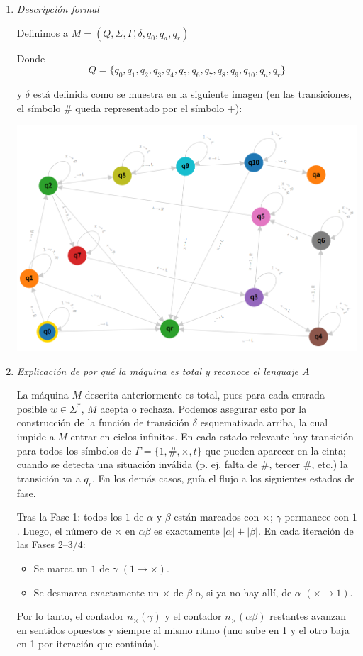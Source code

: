 \documentclass{article}
\begin{document}
\begin{enumerate}
\begin{enumerate}
    \item \textit{Descripción formal}

Definimos a $M = (Q, \Sigma, \Gamma, \delta, q_0, q_{a}, q_{r})$

Donde $$ Q = \{ q_0, q_1, q_2, q_3, q_4, q_5, q_6, q_7, q_8, q_9, q_{10}, q_{a}, q_{r} \}$$

y $\delta$ está definida como se muestra en la siguiente imagen (en las transiciones, el símbolo $\#$ queda representado por el símbolo +):

\includegraphics[scale = 0.42]{unary adder.png}

    \item \textit{Explicación de por qué la máquina es total y reconoce el lenguaje $A$}

La máquina $M$ descrita anteriormente es total, pues para cada entrada posible $w \in \Sigma^*$, $M$ acepta o rechaza. Podemos asegurar esto por la construcción de la función de transición $\delta$ esquematizada arriba, la cual impide a $M$ entrar en ciclos infinitos. En cada estado relevante hay transición para todos los símbolos de $\Gamma=\{1,\#,\times,t\}$ que pueden aparecer en la cinta; cuando se detecta una situación inválida (p. ej. falta de $\#$, tercer $\#$, etc.) la transición va a $q_r$. En los demás casos, guía el flujo a los siguientes estados de fase.

Tras la Fase 1: todos los $1$ de $\alpha$ y $\beta$ están marcados con $\times$; $\gamma$ permanece con $1$. Luego, el número de $\times$ en $\alpha\beta$ es exactamente $|\alpha|+|\beta|$. En cada iteración de las Fases 2–3/4:
  \begin{itemize}
      \item Se marca un $1$ de $\gamma$ $(1\to\times)$.
      \item Se desmarca exactamente un $\times$ de $\beta$ o, si ya no hay allí, de $\alpha$ $(\times\to 1)$.
  \end{itemize}
  Por lo tanto, el contador $n_{\times}(\gamma)$ y el contador $n_{\times}(\alpha\beta)$ restantes avanzan en sentidos opuestos y siempre al mismo ritmo (uno sube en 1 y el otro baja en 1 por iteración que continúa).


\end{enumerate}
\end{enumerate}
\end{document}
